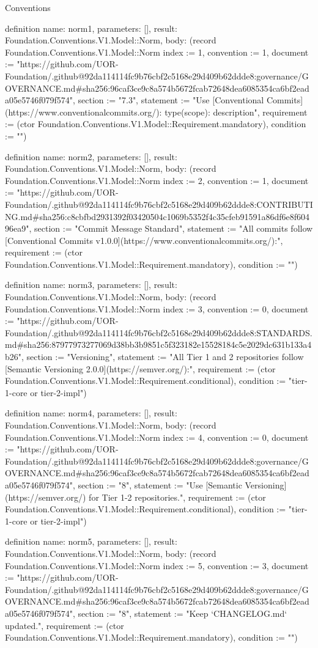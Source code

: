 \begin{lexlean}{Conventions}
\begin{semanticmodule}
definition{
  name: norm1,
  parameters: [],
  result: Foundation.Conventions.V1.Model::Norm,
  body: (record Foundation.Conventions.V1.Model::Norm {index := 1, convention := 1, document := "https://github.com/UOR-Foundation/.github@92da114114fc9b76cbf2c5168e29d409b62ddde8:governance/GOVERNANCE.md#sha256:96caf3ce9c8a574b5672fcab72648dea6085354ca6bf2eada05e5746f079f574", section := "7.3", statement := "Use [Conventional Commits](https://www.conventionalcommits.org/): type(scope): description", requirement := (ctor Foundation.Conventions.V1.Model::Requirement.mandatory), condition := ""})
}

definition{
  name: norm2,
  parameters: [],
  result: Foundation.Conventions.V1.Model::Norm,
  body: (record Foundation.Conventions.V1.Model::Norm {index := 2, convention := 1, document := "https://github.com/UOR-Foundation/.github@92da114114fc9b76cbf2c5168e29d409b62ddde8:CONTRIBUTING.md#sha256:c8cbfbd2931392f03420504c1069b5352f4c35cfeb91591a86df6e8f60496ea9", section := "Commit Message Standard", statement := "All commits follow [Conventional Commits v1.0.0](https://www.conventionalcommits.org/):", requirement := (ctor Foundation.Conventions.V1.Model::Requirement.mandatory), condition := ""})
}

definition{
  name: norm3,
  parameters: [],
  result: Foundation.Conventions.V1.Model::Norm,
  body: (record Foundation.Conventions.V1.Model::Norm {index := 3, convention := 0, document := "https://github.com/UOR-Foundation/.github@92da114114fc9b76cbf2c5168e29d409b62ddde8:STANDARDS.md#sha256:87977973277069d38bb3b9851c5f323182e15528184c5e2029dc631b133a4b26", section := "Versioning", statement := "All Tier 1 and 2 repositories follow [Semantic Versioning 2.0.0](https://semver.org/):", requirement := (ctor Foundation.Conventions.V1.Model::Requirement.conditional), condition := "tier-1-core or tier-2-impl"})
}

definition{
  name: norm4,
  parameters: [],
  result: Foundation.Conventions.V1.Model::Norm,
  body: (record Foundation.Conventions.V1.Model::Norm {index := 4, convention := 0, document := "https://github.com/UOR-Foundation/.github@92da114114fc9b76cbf2c5168e29d409b62ddde8:governance/GOVERNANCE.md#sha256:96caf3ce9c8a574b5672fcab72648dea6085354ca6bf2eada05e5746f079f574", section := "8", statement := "Use [Semantic Versioning](https://semver.org/) for Tier 1-2 repositories.", requirement := (ctor Foundation.Conventions.V1.Model::Requirement.conditional), condition := "tier-1-core or tier-2-impl"})
}

definition{
  name: norm5,
  parameters: [],
  result: Foundation.Conventions.V1.Model::Norm,
  body: (record Foundation.Conventions.V1.Model::Norm {index := 5, convention := 3, document := "https://github.com/UOR-Foundation/.github@92da114114fc9b76cbf2c5168e29d409b62ddde8:governance/GOVERNANCE.md#sha256:96caf3ce9c8a574b5672fcab72648dea6085354ca6bf2eada05e5746f079f574", section := "8", statement := "Keep `CHANGELOG.md` updated.", requirement := (ctor Foundation.Conventions.V1.Model::Requirement.mandatory), condition := ""})
}


\end{semanticmodule}
\end{lexlean}
